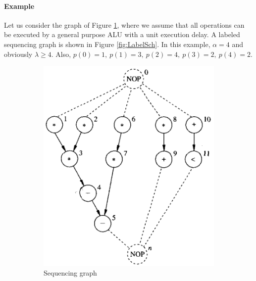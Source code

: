 \paragraph{Example}
Let us consider the graph of Figure \ref{fig:Seqgraph},  where we assume that all operations can  be  executed  by  a general purpose  ALU  with a unit execution delay. A labeled sequencing graph is shown in Figure \ref{fig:LabelSch}.  In this example, $ \alpha = 4 $  and obviously $ \lambda \geq 4 $. Also, $ p(0)=1,\:p(1)=3,\:p(2)=4,\:p(3)=2,\:p(4)=2 $.

\begin{figure}[H]
    \centering
    \begin{subfigure}[b]{0.4\textwidth}
        \includegraphics[width=\textwidth]{./Cap4/Images/Image01.png}
        \caption{Sequencing  graph}
   		\label{fig:Seqgraph}
    \end{subfigure}
    \quad\quad\quad
    \begin{subfigure}[b]{0.4\textwidth}

\end{subfigure}
\end{figure}
